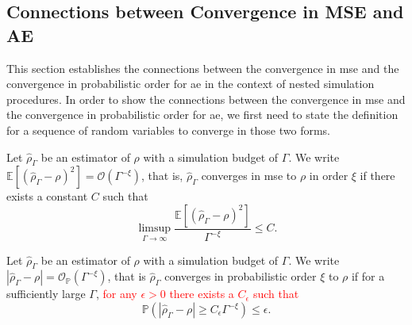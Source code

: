 \subsection{Connections between Convergence in MSE and AE}\label{sec1:connection-mse-absolute-error}

This section establishes the connections between the convergence in \gls{mse} and the convergence in probabilistic order for \gls{ae} in the context of nested simulation procedures.
In order to show the connections between the convergence in \gls{mse} and the convergence in probabilistic order for \gls{ae}, we first need to state the definition for a sequence of random variables to converge in those two forms.

\begin{definition}
    Let $\hat{\rho}_{\Gamma}$ be an estimator of $\rho$ with a simulation budget of $\Gamma$. 
    We write $\mathbb{E} \left[ \left(\hat{\rho}_{\Gamma} - \rho\right)^2 \right] = \mathcal{O} \left( \Gamma^{-\xi} \right)$, that is, $\hat{\rho}_{\Gamma}$ converges in \gls{mse} to $\rho$ in order $\xi$ if there exists a constant $C$ such that
    $$
        \limsup_{\Gamma \to \infty} \frac{\mathbb{E} \left[\left(\hat{\rho}_{\Gamma} - \rho\right)^2 \right]}{\Gamma^{-\xi}} \leq C.
    $$
\end{definition}

\begin{definition}
    Let $\hat{\rho}_{\Gamma}$ be an estimator of $\rho$ with a simulation budget of $\Gamma$. 
    We write $|\hat{\rho}_{\Gamma} - \rho| = \mathcal{O}_{\mathbb{P}}(\Gamma^{-\xi})$, that is $\hat{\rho}_{\Gamma}$ converges in probabilistic order $\xi$ to $\rho$ if for a sufficiently large $\Gamma$, \textcolor{red}{for any $\epsilon > 0$ there exists a $C_\epsilon$ such that}
    $$
         \mathbb{P} \left( \left| \hat{\rho}_{\Gamma} - \rho \right| \geq C_\epsilon \Gamma^{-\xi} \right) \leq \epsilon.
    $$
\end{definition}

